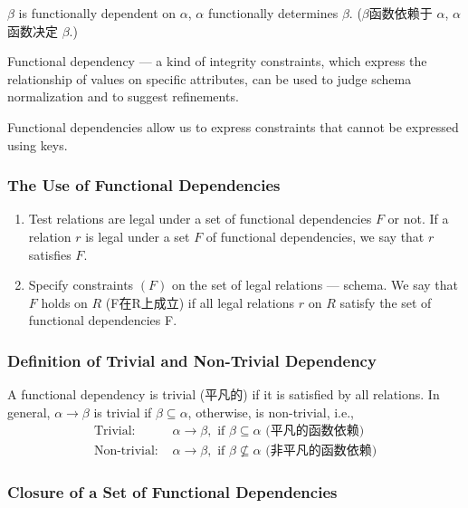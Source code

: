 $\beta$ is functionally dependent on $\alpha$, $\alpha$
functionally determines $\beta$. ($\beta$函数依赖于 $\alpha$, $\alpha$函数决定 $\beta$.)

Functional dependency --- a kind of integrity constraints, which express the relationship of values on specific attributes, can be used to judge schema normalization and to suggest refinements.

Functional dependencies allow us to express constraints that cannot be expressed using keys.

\subsubsection{The Use of Functional Dependencies}
\begin{enumerate}\small
    \item Test relations are legal under a set of  functional dependencies $F$ or not. 
    \subitem If a relation $r$ is legal under a set $F$ of functional dependencies, we say that $r$ satisfies $F$. 
    \item  Specify constraints $(F)$ on the set of legal relations --- schema. 
    \subitem We say that $F$ holds on $R$ (F在R上成立) if all legal relations $r$ on $R$ satisfy the set of functional dependencies F.
\end{enumerate}

\subsubsection{Definition of Trivial and Non-Trivial Dependency}
\begin{definition}
    A functional dependency is trivial (平凡的) if it is satisfied by all relations. In general, $\alpha\rightarrow \beta$ is trivial if $\beta \subseteq \alpha$, otherwise, is non-trivial, i.e., 
    \begin{align*}
        \text{Trivial: }& \alpha\rightarrow \beta,\text{ if }\beta \subseteq \alpha \text{ (平凡的函数依赖)}\\
        \text{Non-trivial: }&\alpha\rightarrow \beta,\text{ if }\beta \nsubseteq  \alpha \text{ (非平凡的函数依赖)}
    \end{align*}    
\end{definition}

\subsubsection{Closure of a Set of Functional Dependencies}

